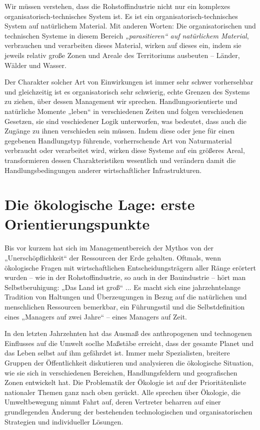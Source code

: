 \documentclass[11pt,a4paper]{article}
\begin{document}
Wir müssen verstehen, dass die Rohstoff\-industrie nicht nur ein komplexes
organisatorisch-technisches System ist. Es ist ein organisatorisch-technisches
System auf natürlichem Material. Mit anderen Worten: Die organisatorischen und
technischen Systeme in diesem Bereich \emph{„parasitieren“ auf natürlichem
  Material}, verbrauchen und verarbeiten dieses Material, wirken auf dieses
ein, indem sie jeweils relativ große Zonen und Areale des Territoriums
ausbeuten -- Länder, Wälder und Wasser.

Der Charakter solcher Art von Einwirkungen ist immer sehr schwer vorhersehbar
und gleichzeitig ist es organisatorisch sehr schwierig, echte Grenzen des
Systems zu ziehen, über dessen Management wir sprechen. Handlungsorientierte
und natürliche Momente „leben“ in verschiedenen Zeiten und folgen
verschiedenen Gesetzen, sie sind veschiedener Logik unterworfen, was bedeutet,
dass auch die Zugänge zu ihnen verschieden sein müssen. Indem diese oder jene
für einen gegebenen Handlungstyp führende, vorherrschende Art von
Naturmaterial verbraucht oder verarbeitet wird, wirken diese Systeme auf ein
größeres Areal, transformieren dessen Charakteristiken wesentlich und
verändern damit die Handlungsbedingungen anderer wirtschaftlicher
Infrastrukturen.

\section{Die ökologische Lage: erste Orientierungspunkte}

Bis vor kurzem hat sich im Managementbereich der Mythos von der
„Unerschöpf\-lichkeit“ der Ressourcen der Erde gehalten. Oftmals, wenn
ökologische Fragen mit wirtschaftlichen Entscheidungsträgern aller Ränge
erörtert wurden -- wie in der Rohstoff\-industrie, so auch in der Bauindustrie
-- hört man Selbstberuhigung: „Das Land ist groß“ ...  Es macht sich eine
jahrzehntelange Tradition von Haltungen und Überzeugungen in Bezug auf die
natürlichen und menschlichen Ressourcen bemerkbar, ein Führungsstil und die
Selbstdefinition eines „Managers auf zwei Jahre“ -- eines Managers auf Zeit.

In den letzten Jahrzehnten hat das Ausmaß des anthropogenen und technogenen
Einflusses auf die Umwelt soclhe Maßstäbe erreicht, dass der gesamte Planet
und das Leben selbst auf ihm gefährdet ist. Immer mehr Spezialisten, breitere
Gruppen der Öffentlichkeit diskutieren und analysieren die ökologische
Situation, wie sie sich in verschiedenen Bereichen, Handlungsfeldern und
geografischen Zonen entwickelt hat. Die Problematik der Ökologie ist auf der
Prioritätenliste nationaler Themen ganz nach oben gerückt. Alle sprechen über
Ökologie, die Umweltbewegung nimmt Fahrt auf, deren Vertreter beharren auf
einer grundlegenden Änderung der bestehenden technologischen und
organisatorischen Strategien und individueller Lösungen.
\end{document}
